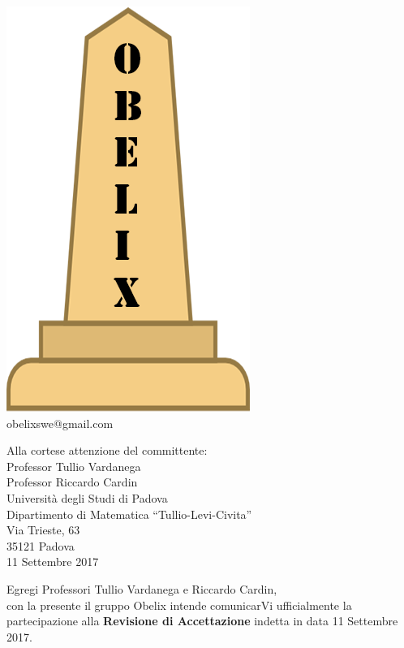 \documentclass[10 pt,a4paper]{article}
\begin{document}
\begin{minipage}[adjusting]{.3\textwidth}
  \begin{centering}
    \includegraphics[width=.5\textwidth]{../../file_comuni/immagini/obelisk_sample_02.png}
    \\
    obelixswe@gmail.com
  \end{centering}
\end{minipage}


\begin{flushright}
  Alla cortese attenzione del committente: \\
\vspace{0.08in}
  Professor Tullio Vardanega \\
  Professor Riccardo Cardin \\
  Università degli Studi di Padova \\
  Dipartimento di Matematica ``Tullio-Levi-Civita''\\
  Via Trieste, 63 \\
  35121 Padova \\
\vspace{0.08in}
  11 Settembre 2017 \\
\end{flushright}
\vspace{0.1in}
Egregi Professori Tullio Vardanega e Riccardo Cardin,\\
con la presente il gruppo Obelix intende comunicarVi ufficialmente
la partecipazione alla \textbf{Revisione di Accettazione} indetta in
data 11 Settembre 2017.
\vspace{.05in}
\end{document}
